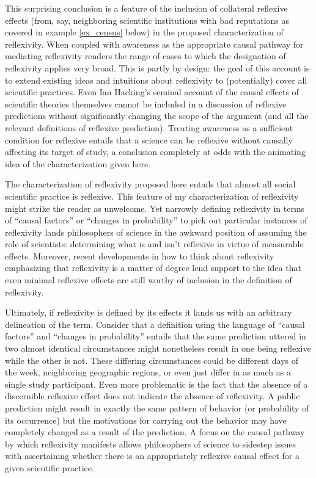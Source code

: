 This surprising conclusion is a feature of the inclusion of collateral reflexive effects (from, say, neighboring scientific institutions with bad reputations as covered in example \ref{ex_census} below) in the proposed characterization of reflexivity. When coupled with awareness as the appropriate causal pathway for mediating reflexivity renders the range of cases to which the designation of reflexivity applies very broad. This is partly by design: the goal of this account is to extend existing ideas and intuitions about reflexivity to (potentially) cover all scientific practices. Even Ian Hacking's \autocite*{hacking1995} seminal account of the causal effects of scientific theories themselves cannot be included in a discussion of reflexive predictions without significantly changing the scope of the argument (and all the relevant definitions of reflexive prediction). Treating awareness as a sufficient condition for reflexive entails that a science can be reflexive without causally affecting its target of study, a conclusion completely at odds with the animating idea of the characterization given here.

The characterization of reflexivity proposed here entails that almost all social scientific practice is reflexive. This feature of my characterization of reflexivity might strike the reader as unwelcome. Yet narrowly defining reflexivity in terms of ``causal factors'' \autocite{romanos1973,buck1963} or ``changes in probability'' \autocite{kopec2011} to pick out particular instances of reflexivity lands philosophers of science in the awkward position of assuming the role of scientists: determining what is and isn't reflexive in virtue of measurable effects. Moreover, recent developments in how to think about reflexivity emphasizing that reflexivity is a matter of degree \autocite{lowe2018} lend support to the idea that even minimal reflexive effects are still worthy of inclusion in the definition of reflexivity.

Ultimately, if reflexivity is defined by its effects it lands us with an arbitrary delineation of the term. Consider that a definition using the language of ``causal factors'' and ``changes in probability'' entails that the same prediction uttered in two almost identical circumstances might nonetheless result in one being reflexive while the other is not. These differing circumstances could be different days of the week, neighboring geographic regions, or even just differ in as much as a single study participant. Even more problematic is the fact that the absence of a discernible reflexive effect does not indicate the absence of reflexivity. A public prediction might result in exactly the same pattern of behavior (or probability of its occurrence) but the motivations for carrying out the behavior may have completely changed as a result of the prediction. A focus on the causal pathway by which reflexivity manifests allows philosophers of science to sidestep issues with ascertaining whether there is an appropriately reflexive causal effect for a given scientific practice. 

